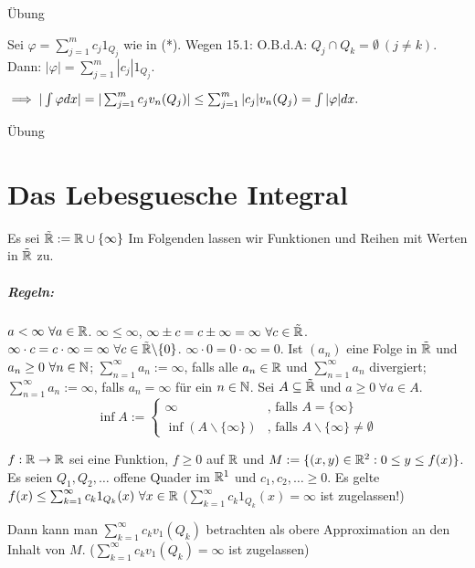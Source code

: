 \documentclass[a4paper,twoside,DIV15,BCOR12mm]{scrbook}
\begin{document}
\begin{beweise}
\item Übung
\item Sei $\varphi = \sum_{j=1}^m c_j1_{Q_j}$ wie in (*). Wegen 15.1: O.B.d.A: $Q_j\cap Q_k = \emptyset\ (j\ne k).$ Dann: $|\varphi| = \sum_{j=1}^m |c_j|1_{Q_j}.$

$\implies |\int\varphi dx| = |\sum_{j=1}^m c_jv_n(Q_j)| \le \sum_{j=1}^m |c_j|v_n(Q_j) = \int|\varphi|dx.$
\item Übung
\end{beweise}


\chapter{Das Lebesguesche Integral}

Es sei $\tilde{\mathbb{R}} := \mathbb{R} \cup \{\infty\}$
Im Folgenden lassen wir Funktionen und Reihen mit Werten in $\tilde{\mathbb{R}}$ zu.
\paragraph{Regeln:} 
$a < \infty \ \forall a\in\mathbb{R}$. $\infty \le \infty$, $\infty \pm c = c \pm \infty = \infty \ \forall c\in \tilde\MdR$. $\infty \cdot c = c \cdot \infty = \infty \ \forall c\in \tilde{\mathbb{R}}\backslash\{0\}$. $\infty \cdot 0 = 0 \cdot \infty = 0$. Ist $(a_n)$ eine Folge in $\tilde{\mathbb{R}}$ und $a_n\ge 0 \ \forall n\in\mathbb{N}$; $\sum_{n=1}^\infty a_n := \infty$, falls alle $a_n \in \mathbb{R}$ und $\sum_{n=1}^\infty a_n$ divergiert; $\sum_{n=1}^\infty a_n := \infty$, falls $a_n = \infty$ für ein $n\in\mathbb{N}$. Sei $A\subseteq \tilde{\mathbb{R}}$ und $a\ge 0 \ \forall a\in A$.
$$ \inf A := \begin{cases}\infty &\text{, falls }A=\{\infty\} \\ \inf(A\backslash\{\infty\})&\text{, falls }A\backslash\{\infty\} \ne \emptyset\end{cases}$$

\begin{motivation}
$f:\mathbb{R} \to \mathbb{R}$ sei eine Funktion, $f\ge 0$ auf $\mathbb{R}$ und $M:=\{(x,y)\in\mathbb{R}^2: 0\le y \le f(x)\}$. Es seien $Q_1,Q_2,\ldots$ offene Quader im $\mathbb{R}^1$ und $c_1,c_2,\ldots \ge 0$. Es gelte $f(x) \le \sum_{k=1}^\infty c_k 1_{Q_k}(x) \ \forall x\in\mathbb{R}$ ($\sum_{k=1}^\infty c_k 1_{Q_k}(x) = \infty$ ist zugelassen!)

Dann kann man $\sum_{k=1}^\infty c_k v_1(Q_k)$ betrachten als obere Approximation an den \glqq Inhalt\grqq{} von $M$. ($\sum_{k=1}^\infty c_k v_1(Q_k)=\infty$ ist zugelassen)
\end{motivation}
\end{document}
